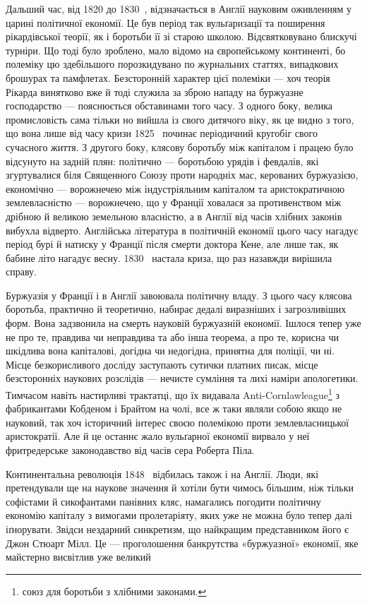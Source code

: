
Дальший час, від 1820 до 1830~, відзначається в Англії науковим
оживленням у царині політичної економії. Це був період
так вульґаризації та поширення рікардівської теорії, як і боротьби
її зі старою школою. Відсвятковувано блискучі турніри.
Що тоді було зроблено, мало відомо на європейському континенті,
бо полеміку цю здебільшого порозкидувано по журнальних
статтях, випадкових брошурах та памфлетах. Безсторонній характер
цієї полеміки — хоч теорія Рікарда винятково вже й тоді
служила за зброю нападу на буржуазне господарство — пояснюється
обставинами того часу. З одного боку, велика промисловість
сама тільки но вийшла із свого дитячого віку, як це видно з того,
що вона лише від часу кризи 1825~ починає періодичний кругобіг
свого сучасного життя. З другого боку, клясову боротьбу між
капіталом і працею було відсунуто на задній плян: політично —
боротьбою урядів і февдалів, які згуртувалися біля Священного
Союзу проти народніх мас, керованих буржуазією, економічно —
ворожнечею між індустріяльним капіталом та аристократичною
землевласністю — ворожнечею, що у Франції ховалася за противенством
між дрібною й великою земельною власністю, а в Англії
від часів хлібних законів вибухла відверто. Англійська література
в політичній економії цього часу нагадує період бурі й натиску
у Франції після смерти доктора Кене, але лише так, як
бабине літо нагадує весну. 1830~ настала криза, що раз назавжди
вирішила справу.

Буржуазія у Франції і в Англії завоювала політичну владу.
З цього часу клясова боротьба, практично й теоретично, набирає
дедалі виразніших і загрозливіших форм. Вона задзвонила
на смерть науковій буржуазній економії. Ішлося тепер уже
не про те, правдива чи неправдива та або інша теорема, а про те,
корисна чи шкідлива вона капіталові, догідна чи недогідна, принятна
для поліції, чи ні. Місце безкорисливого досліду заступають
сутички платних писак, місце безсторонніх наукових розслідів —
нечисте сумління та лихі наміри апологетики. Тимчасом навіть
настирливі трактатці, що їх видавала Anti-Cornlawleague\footnote*{
союз для боротьби з хлібними законами. 
} з
фабрикантами Кобденом і Брайтом на чолі, все ж таки являли
собою якщо не науковий, так хоч історичний інтерес своєю полемікою
проти землевласницької аристократії. Але й це останнє
жало вульґарної економії вирвало у неї фритредерське законодавство
від часів сера Роберта Піла.

Континентальна революція 1848~ відбилась також і на Англії.
Люди, які претендували ще на наукове значення й хотіли бути
чимось більшим, ніж тільки софістами й сикофантами панівних
кляс, намагались погодити політичну економію капіталу з вимогами
пролетаріяту, яких уже не можна було тепер далі іґнорувати.
Звідси нездарний синкретизм, що найкращим представником
його є Джон Стюарт Мілл. Це — проголошення банкрутства
«буржуазної» економії, яке майстерно висвітлив уже великий
\parbreak{}  %
